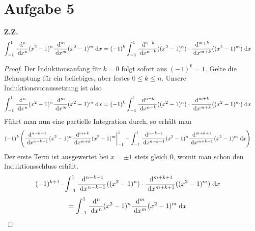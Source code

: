 \documentclass{article}
\theoremstyle{definition}
\begin{document}
\section*{Aufgabe 5}
\textbf{Z.Z.} 
$$\int_{-1}^{1}\frac{\d^n}{\d x^n}(x^2-1)^n\frac{\d^m}{\d x^m}(x^2-1)^m\d x = (-1)^k\int_{-1}^{1}\frac{\d^{n-k}}{\d x^{n-k}}((x^2-1)^n)\cdot\frac{\d^{m+k}}{\d x^{m+k}}((x^2-1)^m)\d x$$
\begin{proof}
	Der Induktionsanfang für $k= 0$ folgt sofort aus $(-1)^0 = 1$.
	Gelte die Behauptung für ein beliebiges, aber festes $0 \leq k \leq n$.
	Unsere Induktionsvoraussetzung ist also 
	$$\int_{-1}^{1}\frac{\d^n}{\d x^n}(x^2-1)^n\frac{\d^m}{\d x^m}(x^2-1)^m\d x = (-1)^k\int_{-1}^{1}\frac{\d^{n-k}}{\d x^{n-k}}((x^2-1)^n)\cdot\frac{\d^{m+k}}{\d x^{m+k}}((x^2-1)^m)\d x$$
	Führt man nun eine partielle Integration durch, so erhält man
	$$(-1)^k \left(\frac{\d^{n-k-1}}{\d x^{n-k-1}}(x^2-1)^n\frac{\d^{m+k}}{\d x^{m+k}}(x^2-1)^m\bigg|_{-1}^1 - \int_{-1}^{1}\frac{\d^{n-k-1}}{\d x^{n-k-1}}(x^2-1)^n\frac{\d^{m+k+1}}{\d x^{m+k+1}}(x^2-1)^m\d x\right)$$
	Der erste Term ist ausgewertet bei $x = \pm 1$ stets gleich 0, womit man schon den Induktionsschluss erhält.
	$$(-1)^{k+1} \cdot \int_{-1}^{1}\frac{\d^{n-k-1}}{\d x^{n-k-1}}((x^2-1)^n)\cdot\frac{\d^{m+k+1}}{\d x^{m+k+1}}((x^2-1)^m)\d x$$
	$$= \int_{-1}^{1}\frac{\d^n}{\d x^n}(x^2-1)^n\frac{\d^m}{\d x^m}(x^2-1)^m\d x$$
\end{proof}
\end{document}
